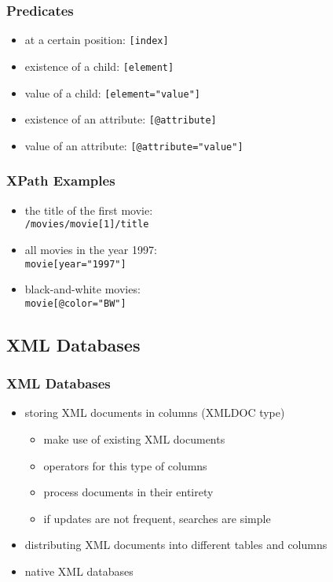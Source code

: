 \documentclass[dvipsnames]{beamer}
\theoremstyle{plain}
\begin{document}
\begin{frame}
  \frametitle{Predicates}

  \begin{itemize}
    \item at a certain position: \lstinline![index]!

    \pause
    \item existence of a child: \lstinline![element]!
    \item value of a child: \lstinline![element="value"]!

    \pause
    \item existence of an attribute: \lstinline![@attribute]!
    \item value of an attribute: \lstinline![@attribute="value"]!
  \end{itemize}
\end{frame}

\begin{frame}
  \frametitle{XPath Examples}

  \begin{example}
    \begin{itemize}
      \item the title of the first movie:\\
        \lstinline!/movies/movie[1]/title!

      \pause
      \item all movies in the year 1997:\\
        \lstinline!movie[year="1997"]!

      \pause
      \item black-and-white movies:\\
        \lstinline!movie[@color="BW"]!
    \end{itemize}
  \end{example}
\end{frame}

\subsection{XML Databases}

\begin{frame}
  \frametitle{XML Databases}

  \begin{itemize}
    \item storing XML documents in columns (XMLDOC type)
    \begin{itemize}
      \item make use of existing XML documents
      \item operators for this type of columns
      \item process documents in their entirety
      \item if updates are not frequent, searches are simple
    \end{itemize}

    \pause
    \item distributing XML documents into different tables and columns

    \pause
    \item native XML databases
  \end{itemize}
\end{frame}
\end{document}
